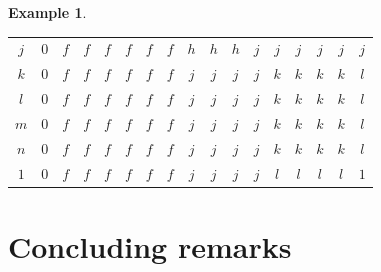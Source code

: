 \documentclass[preprint,12pt]{elsarticle}
\newtheorem{example}[theorem]{Example}
\begin{document}
\begin{example}
\begin{table}[!h]
\begin{tabular}{c|cccccccccccccccc}
$j$ & $0$ & $f$ & $f$ & $f$ & $f$ & $f$ & $f$ & $h$ & $h$ & $h$ & $j$ & $j$ & $j$ & $j$ & $j$ & $j$\\
$k$ & $0$ & $f$ & $f$ & $f$ & $f$ & $f$ & $f$ & $j$ & $j$ & $j$ & $j$ & $k$ & $k$ & $k$ & $k$ & $l$\\
$l$ & $0$ & $f$ & $f$ & $f$ & $f$ & $f$ & $f$ & $j$ & $j$ & $j$ & $j$ & $k$ & $k$ & $k$ & $k$ & $l$\\
$m$ & $0$ & $f$ & $f$ & $f$ & $f$ & $f$ & $f$ & $j$ & $j$ & $j$ & $j$ & $k$ & $k$ & $k$ & $k$ & $l$\\
$n$ & $0$ & $f$ & $f$ & $f$ & $f$ & $f$ & $f$ & $j$ & $j$ & $j$ & $j$ & $k$ & $k$ & $k$ & $k$ & $l$\\
$1$ & $0$ & $f$ & $f$ & $f$ & $f$ & $f$ & $f$ & $j$ & $j$ & $j$ & $j$ & $l$ & $l$ & $l$ & $l$ & $1$\\
\end{tabular}
\end{table}
\end{example}
\section{Concluding remarks }\label{sec:conclusion}
\end{document}
